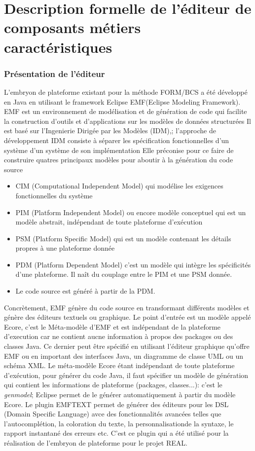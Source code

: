 \chapter {Description formelle de l'éditeur de composants métiers caractéristiques}

\subsection{Présentation de l'éditeur}
L'embryon de plateforme existant pour la méthode FORM/BCS a été développé en Java en utilisant le framework Eclipse EMF(Eclipse Modeling Framework). EMF est un environnement de modélisation et de génération de code qui facilite la construction d'outils et d'applications sur les modèles de données structurées Il est basé sur l'Ingenierie Dirigée par les Modèles (IDM),; l'approche de développement IDM consiste à séparer les spécification fonctionnelles d'un système d'un système de son implémentation Elle préconise pour ce faire de construire quatres principaux modèles pour aboutir à la génération du code source 
\begin{itemize}
	\item CIM (Computational Independent Model) qui modélise les exigences fonctionnelles du système
	\item PIM (Platform Independent Model) ou encore modèle conceptuel qui est un modèle abstrait, indépendant de toute plateforme d'exécution 
	\item PSM (Platform Specific Model) qui est un modèle contenant les détails propres à une plateforme donnée
	\item PDM (Platform Dependent Model) c'est un modèle qui intègre les spécificités d'une plateforme. Il naît du couplage entre le PIM et une PSM donnée.
	\item Le code source est généré à partir de la PDM. 
	\end{itemize}
	
	Concrètement, EMF génère du code source en transformant différents modèles et génère des éditeurs textuels ou graphique. Le point d'entrée est un modèle appelé Ecore, c'est le Méta-modèle d'EMF et est indépendant de la plateforme d'execution car ne contient aucne information à propos des packages ou des classes Java. Ce dernier peut être spécifié en utilisant l'éditeur graphique qu'offre EMF ou en important des interfaces Java, un diagramme de classe UML ou un schéma XML. Le méta-modèle Ecore étant indépendant de toute plateforme d'exécution, pour générer du code Java, il faut spécifier un modèle de génération qui contient les informations de plateforme (packages, classes...): c'est le \textsl{genmodel}; Eclipse permet de le générer automatiquement à partir du modèle Ecore. Le plugin EMFTEXT permet de générer des éditeurs pour les DSL (Domain Specific Language) avce des fonctionnalités avancées telles que l'autocomplétion, la coloration du texte, la personnalisationde la syntaxe, le rapport instantané des erreurs etc. C'est ce plugin qui a été utilisé pour la réalisation de l'embryon de plateforme pour le projet REAL. 

